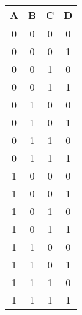 \documentclass[12pt]{article}
\begin{document}
\begin{table}[h]
	\caption{}\label{tab:2}
	\begin{center}
		\begin{tabular}{|c|c|c|c|}
			\hline
			\textbf{A} & \textbf{B} & \textbf{C} & \textbf{D}
			\\\hline
			0          & 0          & 0          & 0
			\\\hline
			0          & 0          & 0          & 1
			\\\hline
			0          & 0          & 1          & 0
			\\\hline
			0          & 0          & 1          & 1
			\\\hline
			0          & 1          & 0          & 0
			\\\hline
			0          & 1          & 0          & 1
			\\\hline
			0          & 1          & 1          & 0
			\\\hline
			0          & 1          & 1          & 1
			\\\hline
			1          & 0          & 0          & 0
			\\\hline
			1          & 0          & 0          & 1
			\\\hline
			1          & 0          & 1          & 0
			\\\hline
			1          & 0          & 1          & 1
			\\\hline
			1          & 1          & 0          & 0
			\\\hline
			1          & 1          & 0          & 1
			\\\hline
			1          & 1          & 1          & 0
			\\\hline
			1          & 1          & 1          & 1
			\\\hline
		\end{tabular}
	\end{center}
\end{table}
\end{document}
